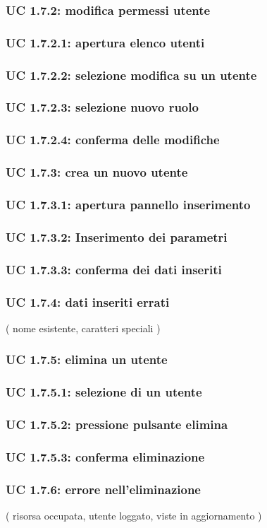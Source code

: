 \subsubsection{UC 1.7.2: modifica permessi utente}
\subsubsection{UC 1.7.2.1: apertura elenco utenti}
\subsubsection{UC 1.7.2.2: selezione modifica su un utente}
\subsubsection{UC 1.7.2.3: selezione nuovo ruolo}
\subsubsection{UC 1.7.2.4: conferma delle modifiche}
\subsubsection{UC 1.7.3: crea un nuovo utente}
\subsubsection{UC 1.7.3.1: apertura pannello inserimento}
\subsubsection{UC 1.7.3.2: Inserimento dei parametri}
\subsubsection{UC 1.7.3.3: conferma dei dati inseriti}
\subsubsection{UC 1.7.4: dati inseriti errati}
( nome esistente, caratteri speciali )

\subsubsection{UC 1.7.5: elimina un utente}
\subsubsection{UC 1.7.5.1: selezione di un utente}
\subsubsection{UC 1.7.5.2: pressione pulsante elimina}
\subsubsection{UC 1.7.5.3: conferma eliminazione}
\subsubsection{UC 1.7.6: errore nell’eliminazione}
( risorsa occupata, utente loggato, viste in aggiornamento )





